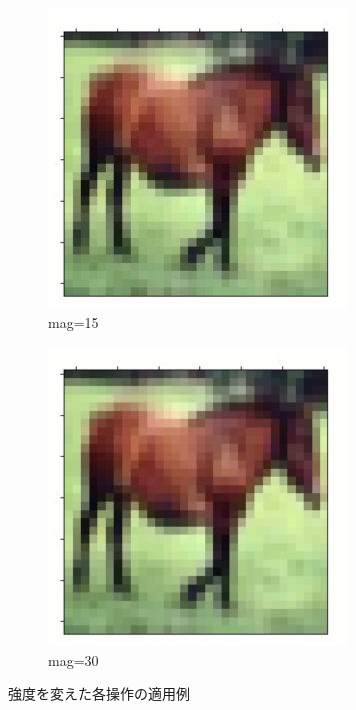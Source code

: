 \documentclass[onecolumn]{ujarticle}   %
\begin{document}
\begin{figure}[h]
\begin{subfigure}{0.3\columnwidth}
        \includegraphics[width=1.0\columnwidth]{transform_test/AutoContrast_15.png}
        \caption{mag=15}
        \label{fig:AutoContrast_15}
      \end{subfigure}
      \begin{subfigure}{0.3\columnwidth}
        \centering
        \includegraphics[width=1.0\columnwidth]{transform_test/AutoContrast_30.png}
        \caption{mag=30}
        \label{fig:AutoContrast_30}
      \end{subfigure}
      \caption{強度を変えた各操作の適用例}
      \label{fig:OperationsWithVariousMagnitude}
    \end{figure}
\end{document}
